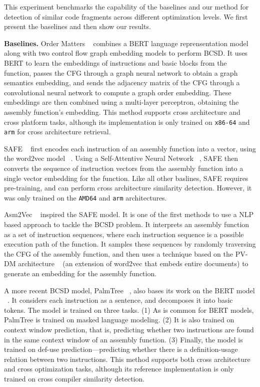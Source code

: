 This experiment benchmarks the capability of the baselines and our method for detection of similar code fragments across
different optimization levels. We first present the baselines and then show our results.

\noindent \textbf{Baselines.} Order Matters ~\cite{OrderMatters} combines a BERT language reprensentation
model ~\cite{BERT} along with two control flow graph embedding models
to perform BCSD. It uses BERT to learn the embeddings of instructions and basic blocks from the function,
passes the CFG through a graph neural network to obtain a graph semantics embedding, and sends the adjacency
matrix of the CFG through a convolutional neural network to compute a graph order embedding. These embeddings
are then combined using a multi-layer perceptron, obtaining the assembly function's embedding. This method
supports cross architecture and cross platform tasks, although its implementation is only trained on \texttt{x86-64}
and \texttt{arm} for cross architecture retrieval.

SAFE ~\cite{SAFE} first encodes each instruction of an assembly function into a vector,
using the word2vec model ~\cite{word2vec}. Using a Self-Attentive Neural Network ~\cite{SANN}, SAFE then converts the sequence of instruction
vectors from the assembly function into a single vector embedding for the function. Like all other baslines, SAFE requires
pre-training, and can perform cross architecture similarity detection. However, it was only trained on the \texttt{AMD64}
and \texttt{arm} architectures.

Asm2Vec ~\cite{Asm2Vec} inspired the SAFE model. It is one of the first methods to use a NLP based approach to tackle
the BCSD problem. It interprets an assembly function as a set of instruction sequences, where each instruction sequence
is a possible execution path of the function. It samples these sequences by randomly traversing the CFG of the assembly
function, and then uses a technique based on the PV-DM architecture ~\cite{PV-DM} (an extension of word2vec that embeds entire documents)
to generate an embedding for the assembly function.

A more recent BCSD model, PalmTree ~\cite{PalmTree}, also bases its work on the BERT model ~\cite{BERT}.
It considers each instruction as a sentence, and decomposes it into basic tokens. The model is trained
on three tasks. (1) As is common for BERT models, PalmTree is trained on masked language modeling. (2)
It is also trained on context window prediction, that is, predicting whether two instructions are found
in the same context window of an assembly function. (3) Finally, the model is trained on def-use prediction---predicting
whether there is a definition-usage relation between two instructions. This method supports
both cross architecture and cross optimization tasks, although its reference implementation is only
trained on cross compiler similarity detection.

